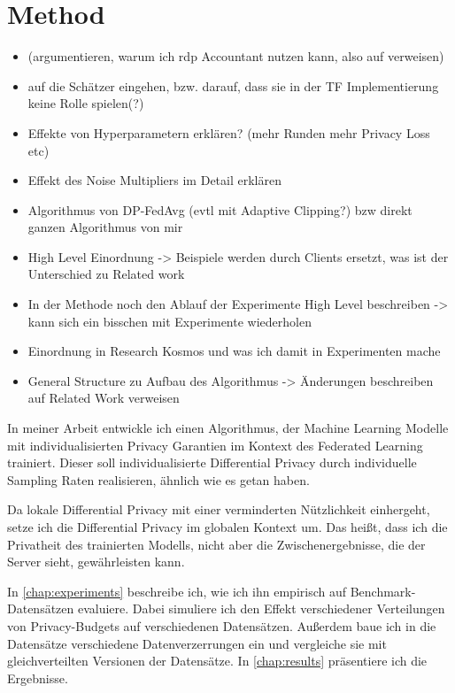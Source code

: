 \chapter{Method}\label{chap:methods}

\begin{itemize}
	\item (argumentieren, warum ich rdp Accountant nutzen kann, also auf \cite[p.26]{boenisch:2023} verweisen)
	\item auf die Schätzer eingehen, bzw. darauf, dass sie in der TF Implementierung keine Rolle spielen(?)
	\item Effekte von Hyperparametern erklären? (mehr Runden mehr Privacy Loss etc)
	\item Effekt des Noise Multipliers im Detail erklären
	\item Algorithmus von DP-FedAvg (evtl mit Adaptive Clipping?) bzw direkt ganzen Algorithmus von mir
	
	\item High Level Einordnung -> Beispiele werden durch Clients ersetzt, was ist der Unterschied zu Related work
	\item In der Methode noch den Ablauf der Experimente High Level beschreiben -> kann sich ein bisschen mit Experimente wiederholen
	\item Einordnung in Research Kosmos und was ich damit in Experimenten mache
	\item General Structure zu Aufbau des Algorithmus -> Änderungen beschreiben auf Related Work verweisen
\end{itemize}

In meiner Arbeit entwickle ich einen Algorithmus, der Machine Learning Modelle mit individualisierten Privacy Garantien im Kontext des Federated Learning trainiert. Dieser soll individualisierte Differential Privacy durch individuelle Sampling Raten realisieren, ähnlich wie es \textcite{jorgensen:2015, boenisch:2023} getan haben.

Da lokale Differential Privacy mit einer verminderten Nützlichkeit einhergeht, setze ich die Differential Privacy im globalen Kontext um. Das heißt, dass ich die Privatheit des trainierten Modells, nicht aber die Zwischenergebnisse, die der Server sieht, gewährleisten kann.

In \autoref{chap:experiments} beschreibe ich, wie ich ihn empirisch auf Benchmark-Datensätzen evaluiere. Dabei simuliere ich den Effekt verschiedener Verteilungen von Privacy-Budgets auf verschiedenen Datensätzen. Außerdem baue ich in die Datensätze verschiedene Datenverzerrungen ein und vergleiche sie mit gleichverteilten Versionen der Datensätze. In \autoref{chap:results} präsentiere ich die Ergebnisse.

